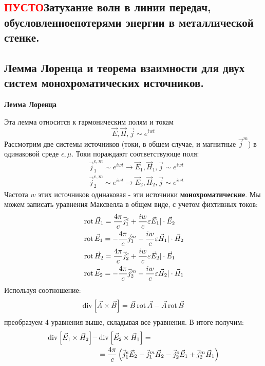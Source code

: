 \subsection{\textcolor{red}{ПУСТО}Затухание волн в линии передач, обусловленноепотерями энергии в металлической стенке.}


\subsection{Лемма Лоренца и теорема взаимности для двух систем монохроматических источников.}
\textbf{Лемма Лоренца}

Эта лемма относится к гармоническим полям и токам
\begin{equation}
	\vec{E},\vec{H},\vec{j}\sim e^{iwt}
\end{equation}
Рассмотрим две системы источников (токи, в общем случае, и магнитные $\vec{j}^m$) в одинаковой среде $\epsilon,\mu$.
Токи пораждают соответствующе поля:
\begin{align*}
	&\vec{j}^{e,m}_1 \sim e^{iwt} \rightarrow \vec{E}_1,\vec{H}_1,\vec{j}\sim e^{iwt}\\
	&\vec{j}^{e,m}_2 \sim e^{iwt} \rightarrow \vec{E}_2,\vec{H}_2,\vec{j}\sim e^{iwt}
\end{align*}
Частота $w$ этих источников одинаковая - эти источники \textbf{монохроматические}. Мы можем записать уравнения Максвелла
в общем виде, с учетом фихтивных токов:
\begin{align*}
	&\operatorname{rot}{\vec{H}_1} = \frac{4\pi}{c}\vec{j}^{e}_1 + \frac{iw}{c}\varepsilon\vec{E}_1|\cdot\vec{E}_2\\
	&\operatorname{rot}{\vec{E}_1} = -\frac{4\pi}{c}\vec{j}^{m}_1 - \frac{iw}{c}\varepsilon\vec{H}_1|\cdot\vec{H}_2\\
	&\operatorname{rot}{\vec{H}_2} = \frac{4\pi}{c}\vec{j}^{e}_2 + \frac{iw}{c}\varepsilon\vec{E}_2|\cdot\vec{E}_1\\
	&\operatorname{rot}{\vec{E}_2} = -\frac{4\pi}{c}\vec{j}^{m}_2 - \frac{iw}{c}\varepsilon\vec{H}_2|\cdot\vec{H}_1
\end{align*}
Используя соотношение:
\begin{equation}
	\operatorname{div}{\left[\vec{A} \times \vec{B} \right]} = \vec{B}\operatorname{rot}{\vec{A}} - \vec{A}\operatorname{rot}{\vec{B}}
\end{equation}
преобразуем 4 уравнения выше, складывая все уравнения. В итоге получим:
\begin{align*}
	\operatorname{div}{\left[\vec{E}_1 \times \vec{H}_2\right]} - &\operatorname{div}{\left[\vec{E}_2 \times \vec{H}_1\right]} = \\
	& = \frac{4\pi}{c}\left( \vec{j}^{e}_1 \vec{E}_2-\vec{j}^{m}_1 \vec{H}_2-\vec{j}^{e}_2 \vec{E}_1+\vec{j}^{m}_2 \vec{H}_1 \right)
\end{align*}

